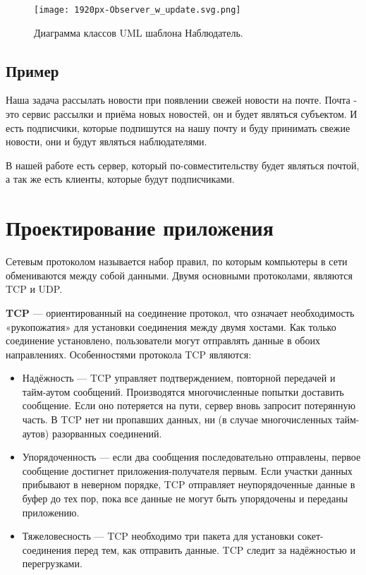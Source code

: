 \begin{figure}[H]
	\begin{center}
		\texttt{[image: 1920px-Observer\_w\_update.svg.png]}
		\caption{Диаграмма классов UML шаблона Наблюдатель.}
	\end{center}
\end{figure}

\subsection{Пример}

Наша задача рассылать новости при появлении свежей новости на почте.
Почта - это сервис рассылки и приёма новых новостей, он и будет являться субъектом.
И есть подписчики, которые подпишутся на нашу почту и буду принимать свежие новости, они и будут являться наблюдателями.

В нашей работе есть сервер, который по-совместительству будет являться почтой, а так же есть клиенты, которые будут подписчиками.

\newpage
\section{Проектирование приложения}

Сетевым протоколом называется набор правил, по которым компьютеры в сети обмениваются между собой данными.
Двумя основными протоколами, являются TCP и UDP.

\textbf{TCP} — ориентированный на соединение протокол, что означает необходимость «рукопожатия» для установки
соединения между двумя хостами. Как только соединение установлено, пользователи могут отправлять данные в обоих направлениях.
Особенностями протокола TCP являются:

\begin{itemize}
	\item Надёжность — TCP управляет подтверждением, повторной передачей и тайм-аутом сообщений.
	Производятся многочисленные попытки доставить сообщение. Если оно потеряется на пути, сервер вновь запросит потерянную часть.
	В TCP нет ни пропавших данных, ни (в случае многочисленных тайм-аутов) разорванных соединений.

    \item Упорядоченность — если два сообщения последовательно отправлены, первое сообщение достигнет приложения-получателя
	первым. Если участки данных прибывают в неверном порядке, TCP отправляет неупорядоченные данные в буфер до тех пор,
	пока все данные не могут быть упорядочены и переданы приложению.

    \item Тяжеловесность — TCP необходимо три пакета для установки сокет-соединения перед тем, как отправить
	данные. TCP следит за надёжностью и перегрузками.
\end{itemize}

